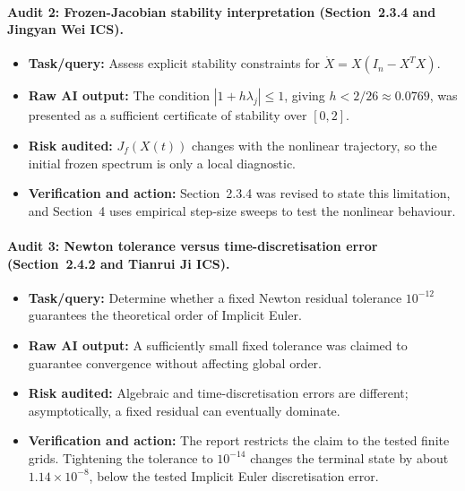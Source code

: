 \paragraph{Audit 2: Frozen-Jacobian stability interpretation
(Section~2.3.4 and Jingyan Wei ICS).}
\begin{itemize}[leftmargin=1.5em, itemsep=2pt]
    \item \textbf{Task/query:} Assess explicit stability constraints for
    $\dot X=X(I_n-X^TX)$.
    \item \textbf{Raw AI output:} The condition
    $|1+h\lambda_j|\leq1$, giving $h<2/26\approx0.0769$, was presented as a
    sufficient certificate of stability over $[0,2]$.
    \item \textbf{Risk audited:} $J_f(X(t))$ changes with the nonlinear
    trajectory, so the initial frozen spectrum is only a local diagnostic.
    \item \textbf{Verification and action:} Section~2.3.4 was revised to state
    this limitation, and Section~4 uses empirical step-size sweeps to test the
    nonlinear behaviour.
\end{itemize}

\paragraph{Audit 3: Newton tolerance versus time-discretisation error
(Section~2.4.2 and Tianrui Ji ICS).}
\begin{itemize}[leftmargin=1.5em, itemsep=2pt]
    \item \textbf{Task/query:} Determine whether a fixed Newton residual
    tolerance $10^{-12}$ guarantees the theoretical order of Implicit Euler.
    \item \textbf{Raw AI output:} A sufficiently small fixed tolerance was
    claimed to guarantee convergence without affecting global order.
    \item \textbf{Risk audited:} Algebraic and time-discretisation errors are
    different; asymptotically, a fixed residual can eventually dominate.
    \item \textbf{Verification and action:} The report restricts the claim to
    the tested finite grids. Tightening the tolerance to $10^{-14}$ changes the
    terminal state by about $1.14\times10^{-8}$, below the tested Implicit
    Euler discretisation error.
\end{itemize}

